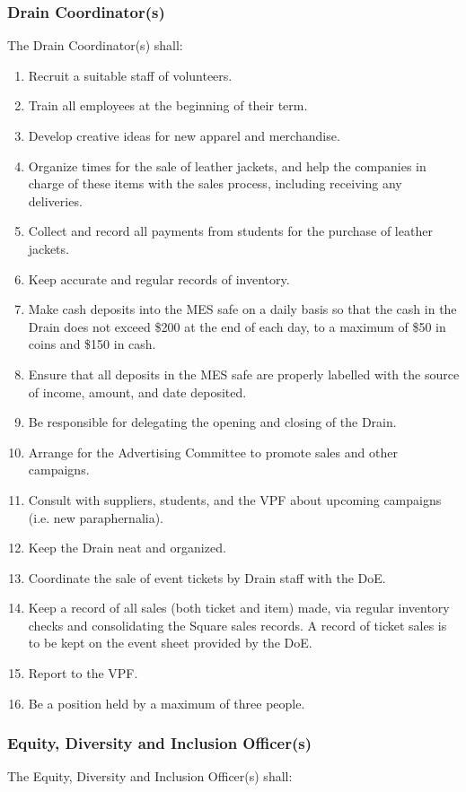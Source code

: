 \subsubsection{Drain Coordinator(s)}
\label{drain-coordinators}
The Drain Coordinator(s) shall:

\begin{enumerate}
 \item
  Recruit a suitable staff of volunteers.
 \item
  Train all employees at the beginning of their term.
 \item
  Develop creative ideas for new apparel and merchandise.
 \item
  Organize times for the sale of leather jackets, and help the companies in charge of these items with the sales process, including receiving any deliveries.
 \item
  Collect and record all payments from students for the purchase of leather jackets.
 \item
  Keep accurate and regular records of inventory.
 \item
  Make cash deposits into the MES safe on a daily basis so that the cash in the Drain does not exceed \$200 at the end of each day, to a maximum of \$50 in coins and \$150 in cash.
 \item
  Ensure that all deposits in the MES safe are properly labelled with the source of income, amount, and date deposited.
 \item
  Be responsible for delegating the opening and closing of the Drain.
 \item
  Arrange for the Advertising Committee to promote sales and other campaigns.
 \item
  Consult with suppliers, students, and the VPF about upcoming campaigns (i.e. new paraphernalia).
 \item
  Keep the Drain neat and organized.
 \item
  Coordinate the sale of event tickets by Drain staff with the DoE.
 \item
  Keep a record of all sales (both ticket and item) made, via regular inventory checks and consolidating the Square sales records. A record of ticket sales is to be kept on the event sheet provided by the DoE.
 \item
  Report to the VPF.
 \item
  Be a position held by a maximum of three people.
\end{enumerate}

\subsubsection{Equity, Diversity and Inclusion Officer(s)}
\label{equity-diversity-and-inclusion-officers}
The Equity, Diversity and Inclusion Officer(s) shall:

